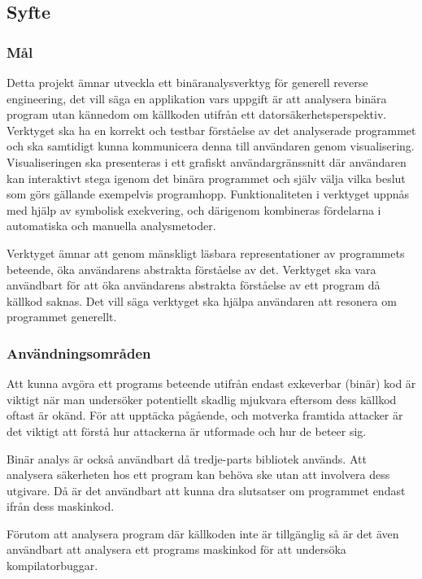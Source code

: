 \subsection{Syfte}

\subsubsection{Mål}
Detta projekt ämnar utveckla ett binäranalysverktyg för generell reverse
engineering, det vill säga en applikation vars uppgift är att analysera binära
program utan kännedom om källkoden utifrån ett datorsäkerhetsperspektiv.
Verktyget ska ha en korrekt och testbar förståelse av det analyserade programmet
och ska samtidigt kunna kommunicera denna till användaren genom visualisering.
Visualiseringen ska presenteras i ett grafiskt användargränssnitt där användaren
kan interaktivt stega igenom det binära programmet och själv välja vilka beslut
som görs gällande exempelvis programhopp. Funktionaliteten i verktyget uppnås
med hjälp av symbolisk exekvering, och därigenom kombineras fördelarna i
automatiska och manuella analysmetoder.

Verktyget ämnar att genom mänskligt läsbara representationer av programmets 
beteende, öka användarens abstrakta förståelse av det. Verktyget ska vara 
användbart för att öka användarens abstrakta förståelse av ett program då källkod 
saknas. Det vill säga verktyget ska hjälpa användaren att resonera om programmet 
generellt. 

\subsubsection{Användningsområden}
Att kunna avgöra ett programs beteende utifrån endast exkeverbar (binär) 
kod är viktigt när man undersöker potentiellt skadlig mjukvara eftersom
dess källkod oftast är okänd. För att upptäcka pågående, och motverka 
framtida attacker är det viktigt att förstå hur attackerna är utformade och
hur de beteer sig. 

Binär analys är också användbart då tredje-parts bibliotek används.
Att analysera säkerheten hos ett program kan behöva ske utan att involvera 
dess utgivare. Då är det användbart att kunna dra slutsatser om programmet 
endast ifrån dess maskinkod. 

Förutom att analysera program där källkoden inte är tillgänglig så är det även 
användbart att analysera ett programs maskinkod för att undersöka kompilatorbuggar.






